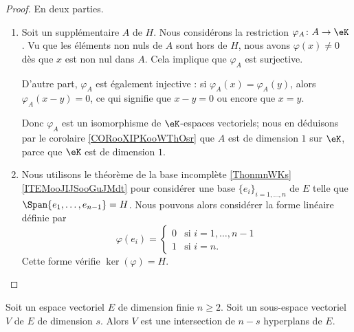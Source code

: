 \begin{proof}
	En deux parties.
	\begin{enumerate}
		\item
		      Soit un supplémentaire \( A\) de \( H\). Nous considérons la restriction \( \varphi_A\colon A\to \eK\). Vu que les éléments non nuls de \( A\) sont hors de \( H\), nous avons \( \varphi(x)\neq 0\) dès que \( x\) est non nul dans \( A\). Cela implique que \( \varphi_A\) est surjective.

		      D'autre part, \( \varphi_A\) est également injective : si \( \varphi_A(x)=\varphi_A(y)\), alors \( \varphi_A(x-y)=0\), ce qui signifie que \( x-y=0\) ou encore que \( x=y\).

		      Donc \( \varphi_A\) est un isomorphisme de \( \eK\)-espaces vectoriels; nous en déduisons par le corolaire \ref{CORooXIPKooWThOsr} que \( A\) est de dimension \( 1\) sur \( \eK\), parce que \( \eK\) est de dimension \( 1\).

		\item
		      Nous utilisons le théorème de la base incomplète \ref{ThonmnWKs}\ref{ITEMooJIJSooGuJMdt} pour considérer une base \( \{ e_i \}_{i=1,\ldots, n}\) de \( E\) telle que \( \Span\{ e_1,\ldots, e_{n-1} \}=H\). Nous pouvons alors considérer la forme linéaire définie par
		      \begin{equation}
			      \varphi(e_i)=\begin{cases}
				      0 & \text{si }  i=1,\ldots, n-1 \\
				      1 & \text{si } i=n.
			      \end{cases}
		      \end{equation}
		      Cette forme vérifie \( \ker(\varphi)=H\).
	\end{enumerate}
\end{proof}

\begin{proposition}
	Soit un espace vectoriel \( E\) de dimension finie \( n\geq 2\). Soit un sous-espace vectoriel \( V\) de \( E\) de dimension \( s\). Alors \( V\) est une intersection de \( n-s\) hyperplans de \( E\).
\end{proposition}

